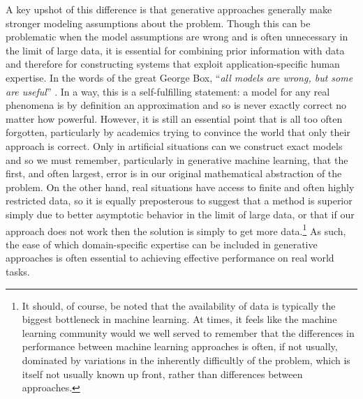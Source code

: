 A key upshot of this difference
is that generative approaches generally make stronger modeling assumptions about the problem.  Though
this can be problematic when the model assumptions are wrong and is often unnecessary in
the limit of large data, it is essential for combining prior information with data
and therefore for constructing systems that exploit application-specific human expertise.
In the words of the great George Box, ``\textit{all models are wrong, but some are useful}''
\citep{box1979robustness,box2005statistics}.  In a way, this is a self-fulfilling statement: a model for
any real phenomena
is by definition an approximation and so is never exactly correct no matter how powerful.  However,
it is still an essential point that is all too often forgotten, particularly by academics trying to convince
the world that only their approach is correct.  Only in artificial situations can we construct exact models
and so we must remember, particularly in generative machine learning, that the first, and often largest,
error is in our original mathematical abstraction of the problem.  On the other hand, real situations
have access to finite and often highly restricted data, so it is equally preposterous to suggest that a
method is superior simply due to better asymptotic behavior in the limit of large data, or that if our approach
does not work then the solution is simply to get more data.\footnote{It should, of course, be noted
	that the availability of data is typically the biggest bottleneck in machine learning.  At times, it feels 
	like the machine learning community would we well served to remember that the differences in performance between
	machine learning approaches is often, if not usually, dominated by variations in the inherently difficultly of the
	problem, which is itself not usually known up front, rather than differences between approaches.}  As such, the ease of which domain-specific
expertise can be included in generative approaches is often essential to achieving effective performance
on real world tasks.

